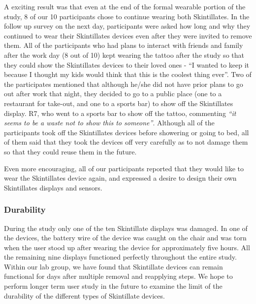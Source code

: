 \documentclass{sigchi}
\begin{document}
A exciting result was that even at the end of the formal wearable portion of the study, 8 of our 10 participants chose to continue wearing both Skintillates.  In the follow up survey on the next day, participants were asked how long and why they continued to wear their Skintillates devices even after they were invited to remove them. All of the participants who had plans to interact with friends and family after the work day (8 out of 10) kept wearing the tattoo after the study so that they could show the Skintillates devices to their loved ones - “I wanted to keep it because I thought my kids would think that this is the coolest thing ever”. Two of the participates mentioned that although he/she did not have prior plans to go out after work that night, they decided to go to a public place (one to a restaurant for take-out, and one to a sports bar) to show off the Skintillates display. R7, who went to a sports bar to show off the tattoo, commenting \textit{“it seems to be a waste not to show this to someone”}. Although all of the participants took off the Skintillates devices before showering or going to bed, all of them said that they took the devices off very carefully as to not damage them so that they could reuse them in the future. 

Even more encouraging, all of our participants reported that they would like to wear the Skintillates device again, and expressed a desire to design their own Skintillates displays and sensors. 

\subsubsection{Durability}
During the study only one of the ten Skintillate displays was damaged. In one of the devices, the battery wire of the device was caught on the chair and was torn when the user stood up after wearing the device for approximately five hours. All the remaining nine displays functioned perfectly throughout the entire study. Within our lab group, we have found that Skintillate devices can remain functional for days after multiple removal and reapplying steps. We hope to perform longer term user study in the future to examine the limit of the durability of the different types of Skintillate devices. 
\end{document}
